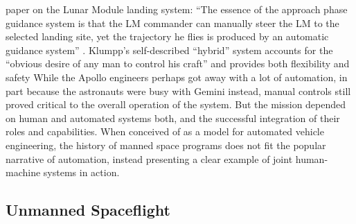 paper on the Lunar Module landing system: ``The essence of the
approach phase guidance system is that the LM commander can manually
steer the LM to the selected landing site, yet the trajectory he flies
is produced by an automatic guidance system'' \cite[p.
  129]{???-Klumpp}. Klumpp's self-described ``hybrid'' system accounts 
for the ``obvious desire of any man to control his craft'' and
provides both flexibility and safety\cite[p. 129-130]{???-Klumpp}
While the Apollo engineers perhaps
got away with a lot of automation, in part because the astronauts were
busy with Gemini instead, manual controls still proved critical to the
overall operation of the system. But the mission depended on human and
automated systems both, and the successful integration of their roles
and capabilities. When conceived of as a model for automated vehicle
engineering, the history of manned space programs does not fit the
popular narrative of automation, instead presenting a clear example of
joint human-machine systems in action.

\subsection{Unmanned Spaceflight}

